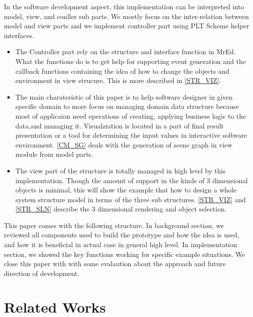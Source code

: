 \documentclass[preprint,nocopyrightspace]{sigplanconf}
\begin{document}
In the software development aspect, this implementation can be interpreted into model, view, and conller sub parts. We mostly focus on the inter-relation between model and view parts and we implement controller part using PLT Scheme helper interfaces.
\begin{itemize}
\item The Controller part rely on the structure and interface function in MrEd. What the functions do is to get help for supporting event generation and the callback functions containing the idea of how to change the objects and environment in view strucure. This is more described in \ref{STR_VIZ}.
\item The main charateristic of this paper is to help software designer in given specific
domain to more focus on managing domain data structure because most of
applicaion need operations of creating, applying business logic to the data,and 
managing it. Visualziation is located in a part of final result presentation
or a tool for determining the input values in interactive software environment. \ref{CM_SG} deals with the generation of scene graph in view module from model parts.
\item The view part of the structure is totally managed in high level by this implementation. Though
the amount of support in the kinds of 3 dimensional objects is minimal, this will show the example that how to design a whole system structure model in terms of the three sub structures. \ref{STR_VIZ} and \ref{STR_SLN} describe the 3 dimensional rendering and object selection.
\end{itemize}

This paper comes with the following structure. In background section, we reviewed all components used to build the prototype and how the idea is used, and how it is beneficial in actual case in general high level. In implementation section,  we showed the key functions working for specific example situations. We close this paper with with some evalaution about the approach and future direction of development.

\section{Related Works}
\end{document}
